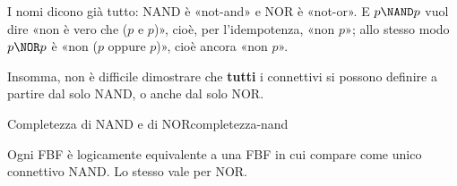 \begin{spiegazione}
    I nomi dicono già tutto: NAND è «not-and» e NOR è «not-or». E $p \NAND p$ vuol dire «non è vero che ($p$ e $p$)», cioè, per l'idempotenza, «non $p$»;
    allo stesso modo $p \NOR p$ è «non ($p$ oppure $p$)», cioè ancora «non $p$».
\end{spiegazione}


Insomma, non è difficile dimostrare che \textbf{tutti} i connettivi si possono definire a partire dal solo NAND,
o anche dal solo NOR.

\begin{concetto}
\begin{Teorema}{Completezza di NAND e di NOR}{completezza-nand}
    \begin{prerequisiti}
    \end{prerequisiti}
    Ogni FBF è logicamente equivalente a una FBF in cui compare come unico connettivo NAND.
    Lo stesso vale per NOR.
\end{Teorema}


\end{concetto}
